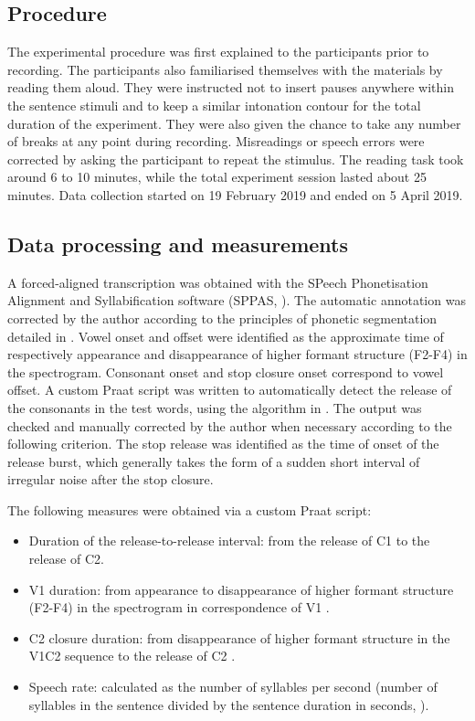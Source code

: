 \documentclass[12pt,a4paper,]{article}
\providecommand{\tightlist}{%
  \setlength{\itemsep}{0pt}\setlength{\parskip}{0pt}}
\begin{document}
\hypertarget{procedure}{%
\subsection{Procedure}\label{procedure}}

The experimental procedure was first explained to the participants prior
to recording. The participants also familiarised themselves with the
materials by reading them aloud. They were instructed not to insert
pauses anywhere within the sentence stimuli and to keep a similar
intonation contour for the total duration of the experiment. They were
also given the chance to take any number of breaks at any point during
recording. Misreadings or speech errors were corrected by asking the
participant to repeat the stimulus. The reading task took around 6 to 10
minutes, while the total experiment session lasted about 25 minutes.
Data collection started on 19 February 2019 and ended on 5 April 2019.

\hypertarget{data-processing-and-measurements}{%
\subsection{Data processing and
measurements}\label{data-processing-and-measurements}}

A forced-aligned transcription was obtained with the SPeech
Phonetisation Alignment and Syllabification software (SPPAS,
\citealt{bigi2015}). The automatic annotation was corrected by the
author according to the principles of phonetic segmentation detailed in
\citet{machac2009}. Vowel onset and offset were identified as the
approximate time of respectively appearance and disappearance of higher
formant structure (F2-F4) in the spectrogram. Consonant onset and stop
closure onset correspond to vowel offset. A custom Praat script was
written to automatically detect the release of the consonants in the
test words, using the algorithm in \citet{ananthapadmanabha2014}. The
output was checked and manually corrected by the author when necessary
according to the following criterion. The stop release was identified as
the time of onset of the release burst, which generally takes the form
of a sudden short interval of irregular noise after the stop closure.

The following measures were obtained via a custom Praat script:

\begin{itemize}
\tightlist
\item
  Duration of the release-to-release interval: from the release of C1 to
  the release of C2.
\item
  V1 duration: from appearance to disappearance of higher formant
  structure (F2-F4) in the spectrogram in correspondence of V1
  \citep{machac2009}.
\item
  C2 closure duration: from disappearance of higher formant structure in
  the V1C2 sequence to the release of C2 \citep{machac2009}.
\item
  Speech rate: calculated as the number of syllables per second (number
  of syllables in the sentence divided by the sentence duration in
  seconds, \citealt{plug2018a}).
\end{itemize}
\end{document}
